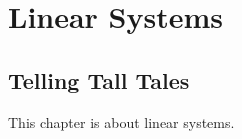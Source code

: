 \chapter{Linear Systems}\label{c:linsys}
\section{Telling Tall Tales}

This chapter is about \gls{linear system}s.
